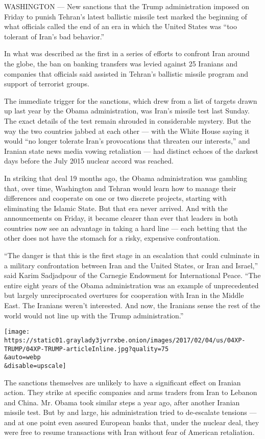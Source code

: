 WASHINGTON --- New sanctions that the Trump administration imposed on
Friday to punish Tehran's latest ballistic missile test marked the
beginning of what officials called the end of an era in which the United
States was ``too tolerant of Iran's bad behavior.''

In what was described as the first in a series of efforts to confront
Iran around the globe, the ban on banking transfers was levied against
25 Iranians and companies that officials said assisted in Tehran's
ballistic missile program and support of terrorist groups.

The immediate trigger for the sanctions, which drew from a list of
targets drawn up last year by the Obama administration, was Iran's
missile test last Sunday. The exact details of the test remain shrouded
in considerable mystery. But the way the two countries jabbed at each
other --- with the White House saying it would ``no longer tolerate
Iran's provocations that threaten our interests,'' and Iranian state
news media vowing retaliation --- had distinct echoes of the darkest
days before the July 2015 nuclear accord was reached.

In striking that deal 19 months ago, the Obama administration was
gambling that, over time, Washington and Tehran would learn how to
manage their differences and cooperate on one or two discrete projects,
starting with eliminating the Islamic State. But that era never arrived.
And with the announcements on Friday, it became clearer than ever that
leaders in both countries now see an advantage in taking a hard line ---
each betting that the other does not have the stomach for a risky,
expensive confrontation.

``The danger is that this is the first stage in an escalation that could
culminate in a military confrontation between Iran and the United
States, or Iran and Israel,'' said Karim Sadjadpour of the Carnegie
Endowment for International Peace. ``The entire eight years of the Obama
administration was an example of unprecedented but largely
unreciprocated overtures for cooperation with Iran in the Middle East.
The Iranians weren't interested. And now, the Iranians sense the rest of
the world would not line up with the Trump administration.''

\texttt{[image: https://static01.graylady3jvrrxbe.onion/images/2017/02/04/us/04XP-TRUMP/04XP-TRUMP-articleInline.jpg?quality=75\\\&auto=webp\\\&disable=upscale]}

The sanctions themselves are unlikely to have a significant effect on
Iranian action. They strike at specific companies and arms traders from
Iran to Lebanon and China. Mr. Obama took similar steps a year ago,
after another Iranian missile test. But by and large, his administration
tried to de-escalate tensions --- and at one point even assured European
banks that, under the nuclear deal, they were free to resume
transactions with Iran without fear of American retaliation.

